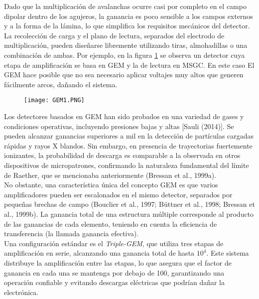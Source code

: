 \documentclass{article}
\begin{document}
\noindent Dado que la multiplicación de avalanchas ocurre casi por completo en el campo dipolar dentro de los agujeros, la ganancia es poco sensible a los campos externos y a la forma de la lámina, lo que simplifica los requisitos mecánicos del detector. La recolección de carga y el plano de lectura, separados del electrodo de multiplicación, pueden diseñarse libremente utilizando tiras, almohadillas o una combinación de ambas. Por ejemplo, en la figura \ref{fig:gem_MSGC} se observa un detector cuya etapa de amplificación se basa en GEM y la de lectura en MSGC. En este caso El GEM hace posible que no sea necesario aplicar voltajes muy altos que generen fácilmente arcos, dañando el sistema. 

\begin{figure}[H]
    \centering
    \texttt{[image: GEM1.PNG]}
    \caption{}
    \label{fig:gem_MSGC}
\end{figure}


\noindent Los detectores basados en GEM han sido probados en una variedad de gases y condiciones operativas, incluyendo presiones bajas y altas [Sauli (2014)]. Se pueden alcanzar ganancias superiores a mil en la detección de partículas cargadas rápidas y rayos X blandos. Sin embargo, en presencia de trayectorias fuertemente ionizantes, la probabilidad de descarga es comparable a la observada en otros dispositivos de micropatrones, confirmando la naturaleza fundamental del límite de Raether, que se mencionaba anteriormente (Bressan et al., 1999a).\\

\noindent No obstante, una característica única del concepto GEM es que varios amplificadores pueden ser escalonados en el mismo detector, separados por pequeñas brechas de campo (Bouclier et al., 1997; Büttner et al., 1998; Bressan et al., 1999b). La ganancia total de una estructura múltiple corresponde al producto de las ganancias de cada elemento, teniendo en cuenta la eficiencia de transferencia (la llamada ganancia efectiva).\\

\noindent Una configuración estándar es el \textit{Triple-GEM}, que utiliza tres etapas de amplificación en serie, alcanzando una ganancia total de hasta $10^4$. Este sistema distribuye la amplificación entre las etapas, lo que asegura que el factor de ganancia en cada una se mantenga por debajo de 100, garantizando una operación confiable y evitando descargas eléctricas que podrían dañar la electrónica.\\
\end{document}
